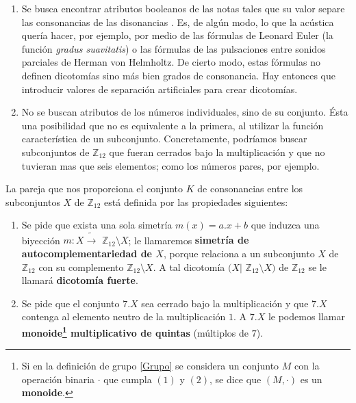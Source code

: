 \documentclass[letterpaper,12pt]{book}
\theoremstyle{definition} \newtheorem{Def}{Definición}[chapter]
\theoremstyle{definition} \newtheorem{Teo}{Teorema}[chapter]
\theoremstyle{definition} \newtheorem{Pro}{Proposición}[chapter]
\theoremstyle{definition} \newtheorem{Lema}{Lema}[chapter]
\begin{document}
 \begin{enumerate}
\item Se busca encontrar atributos booleanos de las notas tales que su valor separe las consonancias de las disonancias . Es, de algún modo, lo que la acústica quería hacer, por ejemplo, por medio de las fórmulas de Leonard Euler (la función \emph{gradus suavitatis}) o las fórmulas de las pulsaciones entre sonidos parciales de Herman von Helmholtz. De cierto modo, estas fórmulas no definen dicotomías sino más bien grados de consonancia. Hay entonces que introducir valores de separación artificiales para crear dicotomías. 
\item No se buscan atributos de los números individuales, sino de su conjunto. Ésta una posibilidad que no es equivalente a la primera, al utilizar la función característica de un subconjunto. Concretamente, podríamos buscar subconjuntos de $\mathbb{Z}_{12}$ que fueran cerrados bajo la multiplicación y que no tuvieran mas que seis elementos; como los números pares, por ejemplo.
\end{enumerate} 

La pareja que nos proporciona el conjunto $K$ de consonancias entre los subconjuntos $X$ de $\mathbb{Z}_{12}$ está definida por las propiedades siguientes:

\begin{enumerate}
\item Se pide que exista una sola simetría $m(x)=a.x+b$ que induzca una biyección $m:X \tilde{\to}$ $\mathbb{Z}_{12}\setminus X$; le llamaremos \textbf{simetría de autocomplementariedad de $X$}, porque relaciona a un subconjunto $X$ de $\mathbb{Z}_{12}$ con su complemento $\mathbb{Z}_{12}\setminus X$. A tal dicotomía $(X|$ $\mathbb{Z}_{12}\setminus X)$ de $\mathbb{Z}_{12}$ se le llamará \textbf{dicotomía fuerte}.
\item Se pide que el conjunto $7.X$ sea cerrado bajo la multiplicación y que $7.X$ contenga al elemento neutro de la multiplicación $1$. A $7.X$ le podemos llamar \textbf{monoide\footnote{Si en la definición de grupo \ref{Grupo} se considera un conjunto $M$ con la operación binaria $\cdot$ que cumpla $(1)$ y $(2)$, se dice que $(M,\cdot)$ es un \textbf{monoide}.} multiplicativo de quintas} (múltiplos de $7$).
\end{enumerate} 
\end{document}
